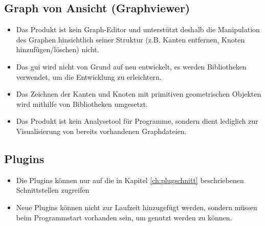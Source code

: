 \subsection{Graph von Ansicht (Graphviewer)}
  \begin{itemize}
    \item Das Produkt ist kein Graph-Editor und unterstützt deshalb die Manipulation des Graphen hinsichtlich seiner Struktur (z.B. Kanten entfernen, Knoten hinzufügen/löschen) nicht.
    \item Das \gls{gui} wird nicht von Grund auf neu entwickelt, es werden Bibliotheken verwendet, um die Entwicklung zu erleichtern.
    \item Das Zeichnen der Kanten und Knoten mit primitiven geometrischen Objekten wird mithilfe von Bibliotheken umgesetzt. %
    \item Das Produkt ist kein Analysetool für Programme, sondern dient lediglich zur Visualisierung von bereits vorhandenen Graphdateien.
  \end{itemize}
\subsection{Plugins}
  \begin{itemize}
    \item Die Plugins können nur auf die in Kapitel \ref{ch:plugschnitt} beschriebenen Schnittstellen zugreifen
    \item Neue Plugins können nicht zur Laufzeit hinzugefügt werden, sondern müssen beim Programmstart vorhanden sein, um genutzt werden zu können.
  \end{itemize}
